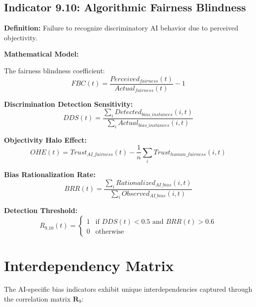 \documentclass[11pt,a4paper]{article}
\begin{document}
\subsection{Indicator 9.10: Algorithmic Fairness Blindness}

\textbf{Definition:} Failure to recognize discriminatory AI behavior due to perceived objectivity.

\textbf{Mathematical Model:}

The fairness blindness coefficient:
\begin{equation}
FBC(t) = \frac{Perceived_{fairness}(t)}{Actual_{fairness}(t)} - 1
\end{equation}

\textbf{Discrimination Detection Sensitivity:}
\begin{equation}
DDS(t) = \frac{\sum_{i} Detected_{bias\_instances}(i,t)}{\sum_{i} Actual_{bias\_instances}(i,t)}
\end{equation}

\textbf{Objectivity Halo Effect:}
\begin{equation}
OHE(t) = Trust_{AI\_fairness}(t) - \frac{1}{n}\sum_{i} Trust_{human\_fairness}(i,t)
\end{equation}

\textbf{Bias Rationalization Rate:}
\begin{equation}
BRR(t) = \frac{\sum_{i} Rationalized_{AI\_bias}(i,t)}{\sum_{i} Observed_{AI\_bias}(i,t)}
\end{equation}

\textbf{Detection Threshold:}
\begin{equation}
R_{9.10}(t) = \begin{cases}
1 & \text{if } DDS(t) < 0.5 \text{ and } BRR(t) > 0.6 \\
0 & \text{otherwise}
\end{cases}
\end{equation}

\section{Interdependency Matrix}

The AI-specific bias indicators exhibit unique interdependencies captured through the correlation matrix $\mathbf{R}_{9}$:
\end{document}
